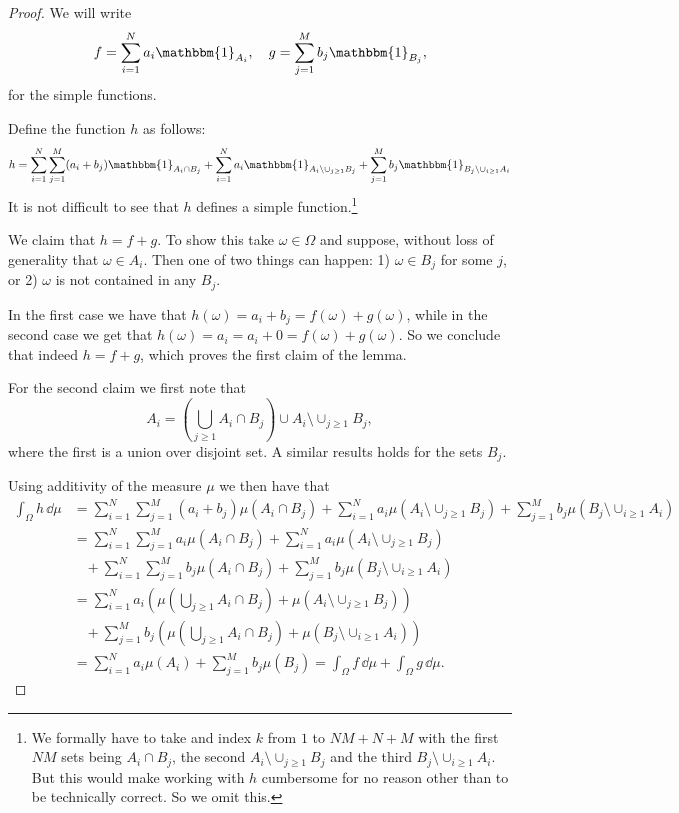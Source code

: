 \begin{proof}
We will write
\[
	f = \sum_{i =1}^N a_i \mathbbm{1}_{A_i}, \quad g = \sum_{j =1}^M b_j \mathbbm{1}_{B_j},
\]
for the simple functions. 

Define the function $h$ as follows:
\[
	h = \sum_{i = 1}^N \sum_{j = 1}^M (a_i + b_j) \mathbbm{1}_{A_i \cap B_j} 
	+ \sum_{i = 1}^N a_i \mathbbm{1}_{A_i \setminus \cup_{j \ge 1} B_j}
	+ \sum_{j = 1}^M b_j \mathbbm{1}_{B_j \setminus \cup_{i \ge 1} A_i}
\]
It is not difficult to see that $h$ defines a simple function.\footnote{We formally have to take and index $k$ from $1$ to $NM + N + M$ with the first $NM$ sets being $A_i \cap B_j$, the second $A_i \setminus \cup_{j \ge 1} B_j$ and the third $B_j \setminus \cup_{i \ge 1} A_i$. But this would make working with $h$ cumbersome for no reason other than to be technically correct. So we omit this.}

We claim that $h = f+g$. To show this take $\omega \in \Omega$ and suppose, without loss of generality that $\omega \in A_i$. Then one of two things can happen: 1) $\omega \in B_j$ for some $j$, or 2) $\omega$ is not contained in any $B_j$.

In the first case we have that $h(\omega) = a_i + b_j = f(\omega) + g(\omega)$, while in the second case we get that $h(\omega) = a_i = a_i + 0 = f(\omega) + g(\omega)$. So we conclude that indeed $h = f+g$, which proves the first claim of the lemma.

For the second claim we first note that
\[
	A_i = \left(\bigcup_{j \ge 1} A_i \cap B_j\right) \cup A_i \setminus \cup_{j \ge 1} B_j,
\]
where the first is a union over disjoint set. A similar results holds for the sets $B_j$.

Using additivity of the measure $\mu$ we then have that
\begin{align*}
	\int_\Omega h \, \dd \mu &= \sum_{i = 1}^N \sum_{j = 1}^M (a_i + b_j) \mu(A_i \cap B_j)
		+ \sum_{i = 1}^N a_i \mu(A_i \setminus \cup_{j \ge 1} B_j)
		+ \sum_{j = 1}^M b_j \mu(B_j \setminus \cup_{i \ge 1} A_i) \\
	&= \sum_{i = 1}^N \sum_{j = 1}^M a_i \mu(A_i \cap B_j)
		+ \sum_{i = 1}^N a_i \mu(A_i \setminus \cup_{j \ge 1} B_j) \\
	&\hspace{10pt}+ \sum_{i = 1}^N \sum_{j = 1}^M b_j \mu(A_i \cap B_j)
		+ \sum_{j = 1}^M b_j \mu(B_j \setminus \cup_{i \ge 1} A_i) \\
	&= \sum_{i = 1}^N a_i \left(\mu(\bigcup_{j \ge 1} A_i \cap B_j) + \mu(A_i \setminus \cup_{j \ge 1} B_j)\right)\\
	&\hspace{10pt}+ \sum_{j = 1}^M b_j \left(\mu(\bigcup_{j \ge 1} A_i \cap B_j) 
		+ \mu(B_j \setminus \cup_{i \ge 1} A_i)\right)\\
	&= \sum_{i = 1}^N a_i \mu(A_i) + \sum_{j = 1}^M b_j \mu(B_j)
		= \int_\Omega f \, \dd \mu + \int_\Omega g \, \dd \mu. 
\end{align*}

\end{proof}

